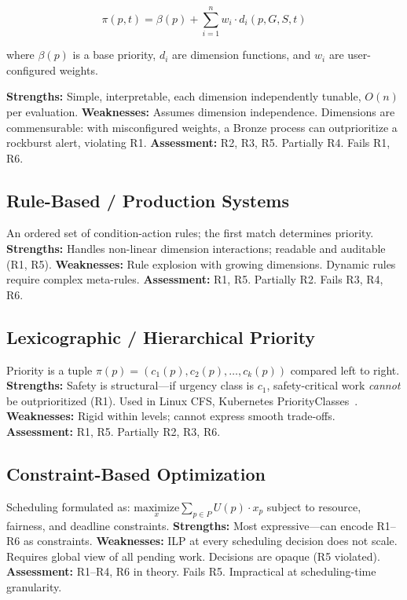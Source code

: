 \documentclass[conference]{IEEEtran}
\begin{document}
\begin{equation}
    \pi(p, t) = \beta(p) + \sum_{i=1}^{n} w_i \cdot d_i(p, G, S, t)
    \label{eq:wsm}
\end{equation}

where $\beta(p)$ is a base priority, $d_i$ are dimension functions, and $w_i$ are user-configured weights.

\textbf{Strengths:} Simple, interpretable, each dimension independently tunable, $O(n)$ per evaluation. \textbf{Weaknesses:} Assumes dimension independence. Dimensions are commensurable: with misconfigured weights, a Bronze process can outprioritize a rockburst alert, violating R1. \textbf{Assessment:} R2, R3, R5. Partially R4. Fails R1, R6.

\subsection{Rule-Based / Production Systems}

An ordered set of condition-action rules; the first match determines priority. \textbf{Strengths:} Handles non-linear dimension interactions; readable and auditable (R1, R5). \textbf{Weaknesses:} Rule explosion with growing dimensions. Dynamic rules require complex meta-rules. \textbf{Assessment:} R1, R5. Partially R2. Fails R3, R4, R6.

\subsection{Lexicographic / Hierarchical Priority}

Priority is a tuple $\pi(p) = (c_1(p), c_2(p), \ldots, c_k(p))$ compared left to right. \textbf{Strengths:} Safety is structural---if urgency class is $c_1$, safety-critical work \emph{cannot} be outprioritized (R1). Used in Linux CFS, Kubernetes PriorityClasses~\cite{kubernetes2023priority}. \textbf{Weaknesses:} Rigid within levels; cannot express smooth trade-offs. \textbf{Assessment:} R1, R5. Partially R2, R3, R6.

\subsection{Constraint-Based Optimization}

Scheduling formulated as: $\underset{x}{\text{maximize}} \sum_{p \in P} U(p) \cdot x_p$ subject to resource, fairness, and deadline constraints. \textbf{Strengths:} Most expressive---can encode R1--R6 as constraints. \textbf{Weaknesses:} ILP at every scheduling decision does not scale. Requires global view of all pending work. Decisions are opaque (R5 violated). \textbf{Assessment:} R1--R4, R6 in theory. Fails R5. Impractical at scheduling-time granularity.
\end{document}
